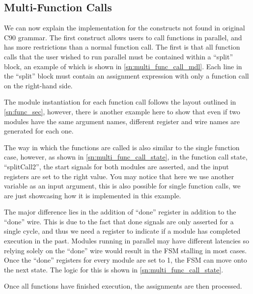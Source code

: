 \subsection{Multi-Function Calls}

We can now explain the implementation for the constructs not found in original C90 grammar. The first construct allows users to call functions in parallel, and has more restrictions than a normal function call. The first is that all function calls that the user wished to run parallel must be contained within a “split” block, an example of which is shown in \autoref{sn:multi_func_call_mdl}. Each line in the “split” block must contain an assignment expression with only a function call on the right-hand side.

The module instantiation for each function call follows the layout outlined in \autoref{sn:func_sec}, however, there is another example here to show that even if two modules have the same argument names, different register and wire names are generated for each one.

The way in which the functions are called is also similar to the single function case, however, as shown in \autoref{sn:multi_func_call_state}, in the function call state, “splitCall2”, the start signals for both modules are asserted, and the input registers are set to the right value. You may notice that here we use another variable as an input argument, this is also possible for single function calls, we are just showcasing how it is implemented in this example. 

The major difference lies in the addition of “done” register in addition to the “done” wire. This is due to the fact that done signals are only asserted for a single cycle, and thus we need a register to indicate if a module has completed execution in the past. Modules running in parallel may have different latencies so relying solely on the “done” wire would result in the FSM stalling in most cases. Once the “done” registers for every module are set to 1, the FSM can move onto the next state. The logic for this is shown in \autoref{sn:multi_func_call_state}.

Once all functions have finished execution, the assignments are then processed.


